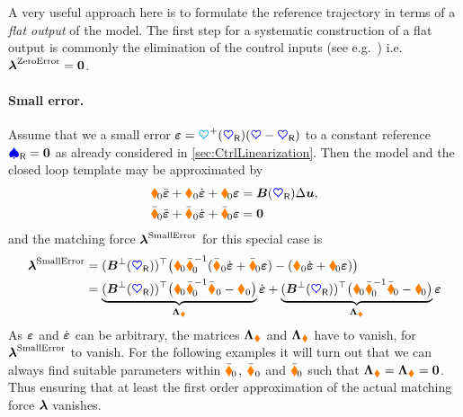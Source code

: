 A very useful approach here is to formulate the reference trajectory in terms of a \textit{flat output} \cite{Fliess:Flatness} of the model.
The first step for a systematic construction of a flat output is commonly the elimination of the control inputs (see e.g.\ \cite{Schlacher:ConstructionOfFlatOutputs}) i.e.\ $\boldsymbol{\lambda}^{\text{ZeroError}}=\boldsymbol{0}$.

\paragraph{Small error.}
Assume that we a small error $\boldsymbol{\varepsilon} = \boldsymbol{\textcolor{cyan}{\heartsuit}}^+(\boldsymbol{\textcolor{blue}{\heartsuit}}_{\mathsf{R}})(\boldsymbol{\textcolor{blue}{\heartsuit}}-\boldsymbol{\textcolor{blue}{\heartsuit}}_{\mathsf{R}})$ to a constant reference $\boldsymbol{\textcolor{blue}{\spadesuit}}_{\mathsf{R}}=\boldsymbol{0}$ as already considered in \autoref{sec:CtrlLinearization}.
Then the model and the closed loop template may be approximated by
\begin{subequations}
\begin{align}
 \boldsymbol{\textcolor{orange}{\blacklozenge}}_{\!\text{0}} \ddot{\boldsymbol{\varepsilon}} + \boldsymbol{\textcolor{orange}{\blacklozenge}}_{\text{0}} \dot{\boldsymbol{\varepsilon}} + \boldsymbol{\textcolor{orange}{\blacklozenge}}_{\!\text{0}} \boldsymbol{\varepsilon} &= \boldsymbol{B}(\boldsymbol{\textcolor{blue}{\heartsuit}}_{\mathsf{R}}) \Delta \boldsymbol{u},
\\
 \bar{\boldsymbol{\textcolor{orange}{\blacklozenge}}}_{\!\text{0}} \ddot{\boldsymbol{\varepsilon}} + \bar{\boldsymbol{\textcolor{orange}{\blacklozenge}}}_{\text{0}} \dot{\boldsymbol{\varepsilon}} + \bar{\boldsymbol{\textcolor{orange}{\blacklozenge}}}_{\!\text{0}} \boldsymbol{\varepsilon} &= \boldsymbol{0}
\end{align}
\end{subequations}
and the matching force $\boldsymbol{\lambda}^{\text{SmallError}}$ for this special case is
\begin{align}\label{eq:MatchingForceLin}
 \tuple{\lambda}^{\text{SmallError}} &= (\sysInputMatLComp(\sysCoordR))^\top \big( \sysInertiaMatLin \sysInertiaMatCLin^{-1} (\sysDissMatCLin \LinErrorCoordd + \sysStiffMatCLin \LinErrorCoord) - (\sysDissMatLin \LinErrorCoordd + \sysStiffMatLin \LinErrorCoord) \big)
\nonumber\\
 &= \underbrace{(\sysInputMatLComp(\sysCoordR))^\top \big( \sysInertiaMatLin \sysInertiaMatCLin^{-1} \sysDissMatCLin - \sysDissMatLin\big)}_{\mat{\Lambda}_{\sysDissMat}} \LinErrorCoordd
  + \underbrace{(\sysInputMatLComp(\sysCoordR))^\top \big( \sysInertiaMatLin \sysInertiaMatCLin^{-1} \sysStiffMatCLin - \sysStiffMatLin\big)}_{\mat{\Lambda}_{\sysStiffMat}} \LinErrorCoord
\end{align}
As $\boldsymbol{\varepsilon}$ and $\dot{\boldsymbol{\varepsilon}}$ can be arbitrary, the matrices $\boldsymbol{\Lambda}_{\boldsymbol{\textcolor{orange}{\blacklozenge}}}$ and $\boldsymbol{\Lambda}_{\boldsymbol{\textcolor{orange}{\blacklozenge}}}$ have to vanish, for $\boldsymbol{\lambda}^{\text{SmallError}}$ to vanish.
For the following examples it will turn out that we can always find suitable parameters within $\bar{\boldsymbol{\textcolor{orange}{\blacklozenge}}}_{\!\text{0}}$, $\bar{\boldsymbol{\textcolor{orange}{\blacklozenge}}}_{\text{0}}$ and $\bar{\boldsymbol{\textcolor{orange}{\blacklozenge}}}_{\!\text{0}}$ such that $\boldsymbol{\Lambda}_{\boldsymbol{\textcolor{orange}{\blacklozenge}}} = \boldsymbol{\Lambda}_{\boldsymbol{\textcolor{orange}{\blacklozenge}}} = \boldsymbol{0}$.
Thus ensuring that at least the first order approximation of the actual matching force $\boldsymbol{\lambda}$ vanishes.

